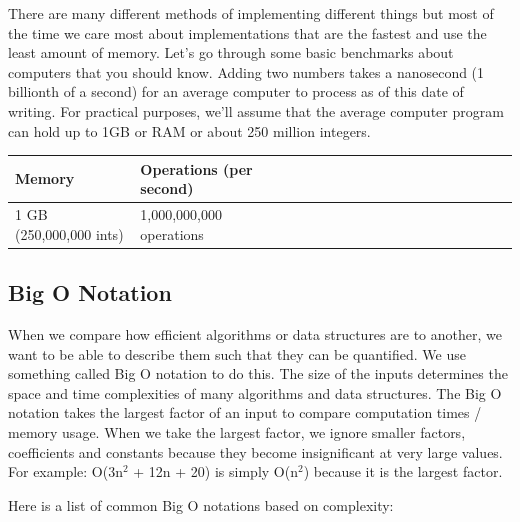 \documentclass[11pt,oneside]{book}
\begin{document}
There are many different methods of implementing different things but most of the time we care most about implementations that are the fastest and use the least amount of memory. Let's go through some basic benchmarks about computers that you should know. Adding two numbers takes a nanosecond (1 billionth of a second) for an average computer to process as of this date of writing. For practical purposes, we'll assume that the average computer program can hold up to 1GB or RAM or about 250 million integers.

\begin{center}\begin{tabulary}{0.4\linewidth}{|l|l|l|l|l|l|l|l|l|l|l|l|l|l|l|l|l|l|l}\hline


  Memory &
  Operations (per second)\\
\hline


  1 GB (250,000,000 ints) &
  1,000,000,000 operations\\

\hline\end{tabulary}\end{center}

\subsection{Big O Notation}

When we compare how efficient algorithms or data structures are to another, we want to be able to describe them such that they can be quantified. We use something called Big O notation to do this. The size of the inputs determines the space and time complexities of many algorithms and data structures. The Big O notation takes the largest factor of an input to compare computation times / memory usage. When we take the largest factor, we ignore smaller factors, coefficients and constants because they become insignificant at very large values. For example: O(3n$^{2}$ + 12n + 20) is simply O(n$^{2}$) because it is the largest factor.

Here is a list of common Big O notations based on complexity:
\end{document}
